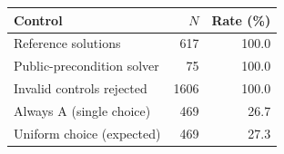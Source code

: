 \begin{tabular}{lrr}
\toprule
Control & $N$ & Rate (\%)\\\midrule
Reference solutions & 617 & 100.0\\
Public-precondition solver & 75 & 100.0\\
Invalid controls rejected & 1606 & 100.0\\
Always A (single choice) & 469 & 26.7\\
Uniform choice (expected) & 469 & 27.3\\
\bottomrule
\end{tabular}
